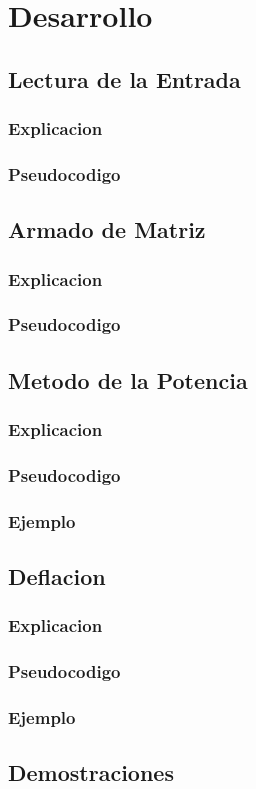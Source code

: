 \section{Desarrollo}
\subsection{Lectura de la Entrada}

\subsubsection{Explicacion}

\subsubsection{Pseudocodigo}

\subsection{Armado de Matriz}

\subsubsection{Explicacion}

\subsubsection{Pseudocodigo}

\subsection{Metodo de la Potencia}

\subsubsection{Explicacion}

\subsubsection{Pseudocodigo}

\subsubsection{Ejemplo}


\subsection{Deflacion}
\subsubsection{Explicacion}

\subsubsection{Pseudocodigo}

\subsubsection{Ejemplo}


\subsection{Demostraciones}

